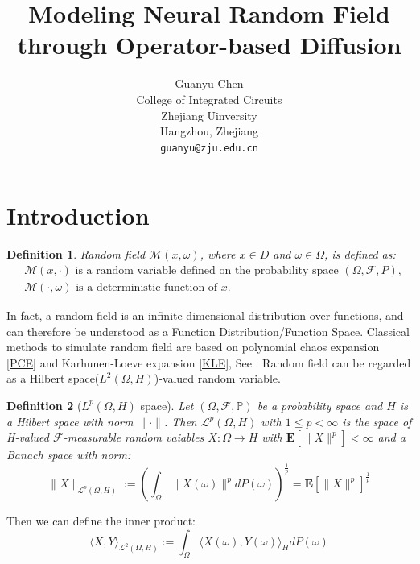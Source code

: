 \documentclass{article}
\title{Modeling Neural Random Field through Operator-based Diffusion}
\author{%
    Guanyu Chen \\
    College of Integrated Circuits\\
    Zhejiang Uinversity\\
    Hangzhou, Zhejiang\\
    \texttt{guanyu@zju.edu.cn} 
}
\newtheorem{definition}{Definition}
\begin{document}
\maketitle


\begin{abstract}

\end{abstract}


\section{Introduction}
\begin{definition}
    Random field $\mathcal{M}(x, \omega)$, where $x\in D$ and $\omega \in \Omega$, is defined as:
\begin{equation}
    \begin{aligned}
        & \mathcal{M}(x, \cdot) \text{ is a random variable defined on the probability space } (\Omega, \mathcal{F}, P),\\
        & \mathcal{M}(\cdot, \omega) \text{ is a deterministic function of } x.
    \end{aligned}
\end{equation}
\end{definition}
In fact, a random field is an infinite-dimensional distribution over functions, and can therefore be understood as a Function Distribution/Function Space. 
Classical methods to simulate random field are based on polynomial chaos expansion \ref{PCE} and Karhunen-Loeve expansion \ref{KLE}, See \cite{Lord_Powell_Shardlow_2014}.
Random field can be regarded as a Hilbert space($L^2(\Omega, H)$)-valued random variable.
\begin{definition}[$L^p(\Omega, H)$ space]
  Let $(\Omega, \mathcal{F}, \mathbb{P})$ be a probability space and $H$ is a Hilbert space with norm $\|\cdot\|$. Then $\mathcal{L}^p(\Omega, H)$ with $1\leq p<\infty$ is the space
  of H-valued $\mathcal{F}$-measurable random vaiables $X:\Omega\rightarrow H$ with $\mathbf{E}[\|X\|^p]<\infty$ and a Banach space with norm:
  \begin{equation}
      \|X\|_{\mathcal{L}^p(\Omega, H)}:=\left(\int_\Omega \|X(\omega)\|^pdP(\omega)\right)^{\frac{1}{p}}=\mathbf{E}[\|X\|^p]^{\frac{1}{p}}
  \end{equation}
\end{definition}
Then we can define the inner product: 
\begin{equation}
  \langle X, Y\rangle_{\mathcal{L}^2(\Omega, H)}:=\int_\Omega \langle X(\omega), Y(\omega)\rangle_H dP(\omega)
\end{equation}
\end{document}
